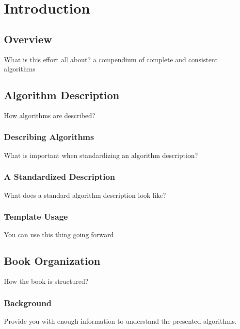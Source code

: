 


\chapter{Introduction}
\label{chap:intro}

\section{Overview}
What is this effort all about?
a compendium of complete and consistent algorithms


\section{Algorithm Description}
How algorithms are described?

\subsection{Describing Algorithms}
What is important when standardizing an algorithm description?

\subsection{A Standardized Description}
What does a standard algorithm description look like?

\subsection{Template Usage}
You can use this thing going forward



\section{Book Organization}
How the book is structured?

\subsection{Background}
Provide you with enough information to understand the presented algorithms.

